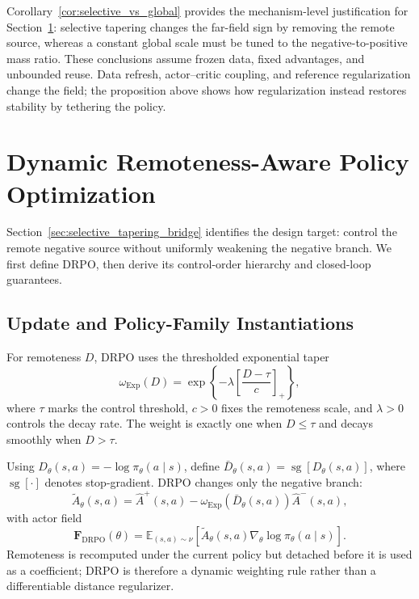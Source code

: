 Corollary~\ref{cor:selective_vs_global} provides the mechanism-level
justification for Section~\ref{sec:drpo}: selective tapering changes the
far-field sign by removing the remote source, whereas a constant global scale
must be tuned to the negative-to-positive mass ratio. These conclusions assume
frozen data, fixed advantages, and unbounded reuse. Data refresh, actor--critic
coupling, and reference regularization change the field; the proposition above
shows how regularization instead restores stability by tethering the policy.

\section{Dynamic Remoteness-Aware Policy Optimization}
\label{sec:drpo}

Section~\ref{sec:selective_tapering_bridge} identifies the design target:
control the remote negative source without uniformly weakening the negative
branch. We first define DRPO, then derive its control-order hierarchy and
closed-loop guarantees.

\subsection{Update and Policy-Family Instantiations}
\label{subsec:drpo_update}

For remoteness \(D\), DRPO uses the thresholded exponential taper
\begin{equation}
    \omega_{\mathrm{Exp}}(D)
    =
    \exp
    \left\{
        -\lambda
        \left[
            \frac{D-\tau}{c}
        \right]_{+}
    \right\},
    \label{eq:drpo_exp_weight}
\end{equation}
where \(\tau\) marks the control threshold, \(c>0\) fixes the remoteness
scale, and \(\lambda>0\) controls the decay rate. The weight is exactly one
when \(D\leq\tau\) and decays smoothly when \(D>\tau\).

Using \(D_\theta(s,a)=-\log\pi_\theta(a\mid s)\), define
\(\bar D_\theta(s,a)=\operatorname{sg}[D_\theta(s,a)]\), where
\(\operatorname{sg}[\cdot]\) denotes stop-gradient. DRPO changes only the
negative branch:
\begin{equation}
    \widetilde A_{\theta}(s,a)
    =
    \widehat A^{+}(s,a)
    -
    \omega_{\mathrm{Exp}}
    \!\left(\bar D_\theta(s,a)\right)
    \widehat A^{-}(s,a),
    \label{eq:drpo_effective_advantage}
\end{equation}
with actor field
\begin{equation}
    \mathbf F_{\mathrm{DRPO}}(\theta)
    =
    \mathbb E_{(s,a)\sim\nu}
    \left[
        \widetilde A_{\theta}(s,a)
        \nabla_\theta\log\pi_\theta(a\mid s)
    \right].
    \label{eq:drpo_actor_field}
\end{equation}
Remoteness is recomputed under the current policy but detached before it is
used as a coefficient; DRPO is therefore a dynamic weighting rule rather than
a differentiable distance regularizer.

